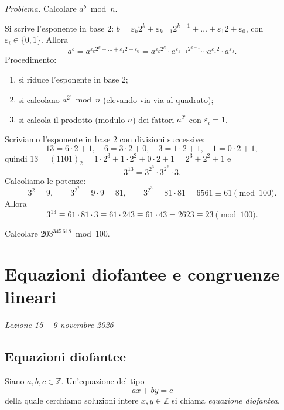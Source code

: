 \documentclass[11pt,a4paper]{article}
\begin{document}
\emph{Problema.} Calcolare $a^b \bmod n$.

Si scrive l'esponente in base $2$: $b = \varepsilon_k 2^k + \varepsilon_{k-1} 2^{k-1} + \dots + \varepsilon_1 2 + \varepsilon_0$, con $\varepsilon_i \in \{0, 1\}$. Allora
\[
  a^b = a^{\varepsilon_k 2^k + \dots + \varepsilon_1 2 + \varepsilon_0} = a^{\varepsilon_k 2^k}\cdot a^{\varepsilon_{k-1}2^{k-1}}\cdots a^{\varepsilon_1 2}\cdot a^{\varepsilon_0}.
\]
Procedimento:
\begin{enumerate}
  \item si riduce l'esponente in base $2$;
  \item si calcolano $a^{2^i} \bmod n$ (elevando via via al quadrato);
  \item si calcola il prodotto (modulo $n$) dei fattori $a^{2^i}$ con $\varepsilon_i = 1$.
\end{enumerate}

\begin{esempio}[$3^{13} \bmod 100$]
Scriviamo l'esponente in base $2$ con divisioni successive:
\[
  13 = 6\cdot 2 + 1,\quad 6 = 3\cdot 2 + 0,\quad 3 = 1\cdot 2 + 1,\quad 1 = 0\cdot 2 + 1,
\]
quindi $13 = (1101)_2 = 1\cdot 2^3 + 1\cdot 2^2 + 0\cdot 2 + 1 = 2^3 + 2^2 + 1$ e
\[
  3^{13} = 3^{2^3}\cdot 3^{2^2}\cdot 3 .
\]
Calcoliamo le potenze:
\[
  3^{2} = 9, \qquad 3^{2^2} = 9\cdot 9 = 81, \qquad 3^{2^3} = 81\cdot 81 = 6561 \equiv 61 \pmod{100}.
\]
Allora
\[
  3^{13} \equiv 61\cdot 81\cdot 3 \equiv 61\cdot 243 \equiv 61\cdot 43 = 2623 \equiv 23 \pmod{100}.
\]
\end{esempio}

\begin{esercizio}
Calcolare $203^{345\,618} \bmod 100$.
\end{esercizio}

\section[Equazioni diofantee e congruenze lineari (Lezione 15 -- 9 novembre 2026)]{Equazioni diofantee e congruenze lineari}
\noindent\emph{Lezione 15 -- 9 novembre 2026}

\subsection{Equazioni diofantee}

\begin{definizione}
Siano $a, b, c \in \mathbb{Z}$. Un'equazione del tipo
\[
  ax + by = c
\]
della quale cerchiamo soluzioni intere $x, y \in \mathbb{Z}$ si chiama \emph{equazione diofantea}.
\end{definizione}
\end{document}
